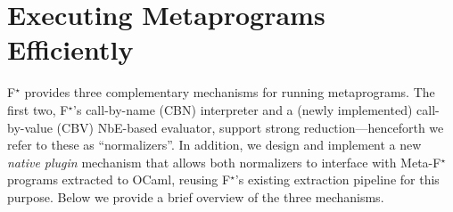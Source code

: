 \documentclass[runningheads]{llncs}
\newcommand\fstar{F$^\star$\xspace}
\newcommand\metafstar{Meta-F$^\star$\xspace}
\newcommand{\comm}[3]{\ifcheckpagebudget\else\ifdraft{{\color{#1}[#2: #3]}}\fi\fi}
\newcommand{\nik}[1]{\comm{dkpurple}{Nik}{#1}}
\newcommand{\guido}[1]{\comm{blue}{Guido}{#1}}
\newcommand{\zp}[1]{\comm{lilac}{Zoe}{#1}}
\begin{document}







\section{Executing Metaprograms Efficiently}
\label{sec:evaluation}


\fstar provides three complementary mechanisms for running metaprograms.
The first two, \fstar's call-by-name (CBN)
interpreter and a (newly implemented) call-by-value (CBV)
NbE-based evaluator, support strong
reduction---henceforth we refer to these as ``normalizers''.
%
In addition, we design and implement a new \emph{native plugin}
mechanism that allows both normalizers to interface with \metafstar
programs extracted to OCaml, reusing \fstar's existing extraction pipeline for
this purpose.
%
%
Below we provide
a brief overview of the three mechanisms.
\end{document}
